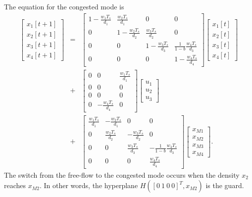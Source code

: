 \documentclass{report}
\begin{document}
The equation for the congested mode is
\begin{eqnarray}
\left[\begin{array}{c}
x_1[t+1]\\
x_2[t+1]\\
x_3[t+1]\\
x_4[t+1]\end{array}\right] & = & \left[\begin{array}{cccc}
1-\frac{w_1T_s}{d_1} & \frac{w_2T_s}{d_1} & 0 & 0\\
0 & 1-\frac{w_2T_s}{d_2} & \frac{w_3T_s}{d_2} & 0\\
0 & 0 & 1-\frac{w_3T_s}{d_3} & \frac{1}{1-b}\frac{w_4T_s}{d_3}\\
0 & 0 & 0 & 1-\frac{w_4T_s}{d_4}\end{array}\right]
\left[\begin{array}{c}
x_1[t]\\
x_2[t]\\
x_3[t]\\
x_4[t]\end{array}\right] \nonumber\\
& + & \left[\begin{array}{ccc}
0 & 0 & \frac{w_1T_s}{d_1}\\
0 & 0 & 0\\
0 & 0 & 0\\
0 & -\frac{w_4T_s}{d_4} & 0\end{array}\right]\left[\begin{array}{c}
u_1\\
u_2\\
u_3\end{array}\right] \nonumber\\
& + & \left[\begin{array}{cccc}
\frac{w_1T_s}{d_1} & -\frac{w_2T_s}{d_1} & 0 & 0\\
0 & \frac{w_2T_s}{d_2} & -\frac{w_3T_s}{d_2} & 0\\
0 & 0 & \frac{w_3T_s}{d_3} & -\frac{1}{1-b}\frac{w_4T_s}{d_3}\\
0 & 0 & 0 & \frac{w_4T_s}{d_4}\end{array}\right]
\left[\begin{array}{c}
x_{M1}\\
x_{M2}\\
x_{M3}\\
x_{M4}\end{array}\right]. \label{cflow}
\end{eqnarray}
The switch from the free-flow to the congested mode occurs when the density
 $x_2$ reaches $x_{M2}$. In other words, the hyperplane
$H([0 ~ 1 ~ 0 ~ 0]^T, x_{M2})$ is the guard.
\end{document}
